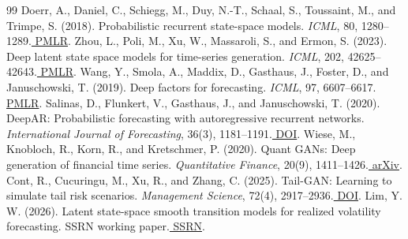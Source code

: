 \documentclass[11pt]{article}
\begin{document}
\begin{thebibliography}{99}
 Doerr, A., Daniel, C., Schiegg, M., Duy, N.-T., Schaal, S., Toussaint, M., and Trimpe, S. (2018). Probabilistic recurrent state-space models. \emph{ICML}, 80, 1280--1289.\href{https://proceedings.mlr.press/v80/doerr18a.html}{ PMLR}.
 Zhou, L., Poli, M., Xu, W., Massaroli, S., and Ermon, S. (2023). Deep latent state space models for time-series generation. \emph{ICML}, 202, 42625--42643.\href{https://proceedings.mlr.press/v202/zhou23i.html}{ PMLR}.
 Wang, Y., Smola, A., Maddix, D., Gasthaus, J., Foster, D., and Januschowski, T. (2019). Deep factors for forecasting. \emph{ICML}, 97, 6607--6617.\href{https://proceedings.mlr.press/v97/wang19k.html}{ PMLR}.
 Salinas, D., Flunkert, V., Gasthaus, J., and Januschowski, T. (2020). DeepAR: Probabilistic forecasting with autoregressive recurrent networks. \emph{International Journal of Forecasting}, 36(3), 1181--1191.\href{https://doi.org/10.1016/j.ijforecast.2019.07.001}{ DOI}.
 Wiese, M., Knobloch, R., Korn, R., and Kretschmer, P. (2020). Quant GANs: Deep generation of financial time series. \emph{Quantitative Finance}, 20(9), 1411--1426.\href{https://arxiv.org/abs/1907.06673}{ arXiv}.
 Cont, R., Cucuringu, M., Xu, R., and Zhang, C. (2025). Tail-GAN: Learning to simulate tail risk scenarios. \emph{Management Science}, 72(4), 2917--2936.\href{https://doi.org/10.1287/mnsc.2023.00936}{ DOI}.
 Lim, Y. W. (2026). Latent state-space smooth transition models for realized volatility forecasting. SSRN working paper.\href{https://ssrn.com/abstract=6457278}{ SSRN}.
\end{thebibliography}
\end{document}
